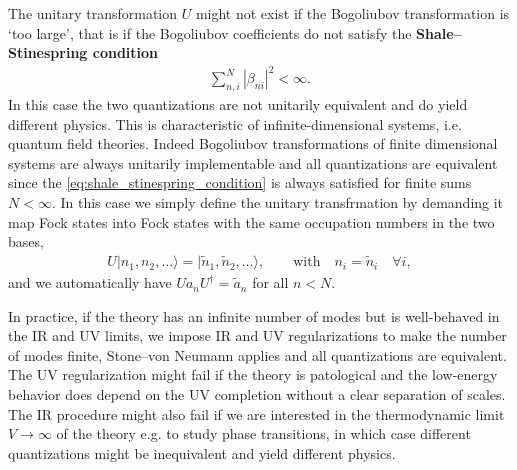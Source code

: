 \documentclass[../QFT_main.tex]{subfiles}
\begin{document}
\begin{mytheorem}
The unitary transformation $U$ might not exist if the Bogoliubov transformation is `too large', that is if the Bogoliubov coefficients do not satisfy the \textbf{Shale--Stinespring condition}
\begin{align}\label{eq:shale_stinespring_condition}
     \sum_{n,i}^N |\beta_{ni}|^2 < \infty.
\end{align}
In this case the two quantizations are not unitarily equivalent and do yield different physics.
This is characteristic of infinite-dimensional systems, i.e. quantum field theories.
Indeed Bogoliubov transformations of finite dimensional systems are always unitarily implementable and all quantizations are equivalent since the \eqref{eq:shale_stinespring_condition} is always satisfied for finite sums $N<\infty$.
In this case we simply define the unitary transfrmation by demanding it map Fock states into Fock states with the same occupation numbers in the two bases,
\begin{align}
    U|n_1, n_2, \dots\rangle = |\tilde{n}_1, \tilde{n}_2, \dots\rangle, \qquad \text{with}\quad n_i = \tilde{n}_i \quad \forall i,
\end{align}
and we automatically have $U a_n U^\dagger = \tilde{a}_n$ for all $n<N$.

In practice, if the theory has an infinite number of modes but is well-behaved in the IR and UV limits, we impose IR and UV regularizations to make the number of modes finite, Stone--von Neumann applies and all quantizations are equivalent.
The UV regularization might fail if the theory is patological and the low-energy behavior does depend on the UV completion without a clear separation of scales.
The IR procedure might also fail if we are interested in the thermodynamic limit $V\to\infty$ of the theory e.g. to study phase transitions, in which case different quantizations might be inequivalent and yield different physics.
%
\end{mytheorem}
\end{document}
